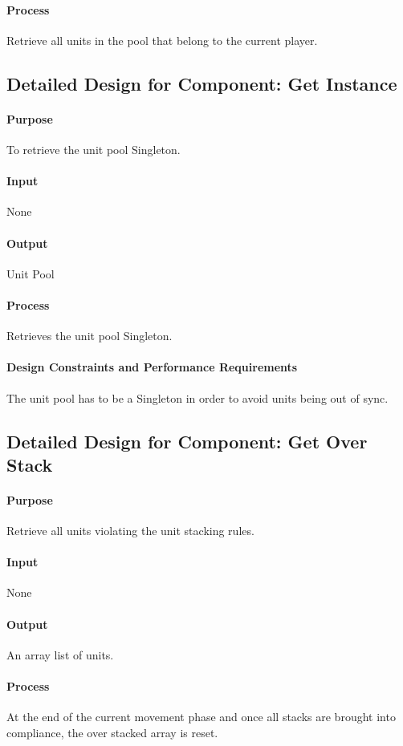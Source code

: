 \documentclass[12pt,a4paper,titlepage]{article}
\begin{document}
\paragraph{Process} Retrieve all units in the pool that belong to the current player.

\subsection{Detailed Design for Component: Get Instance}
\paragraph{Purpose} To retrieve the unit pool Singleton.
\paragraph{Input} None
\paragraph{Output} Unit Pool
\paragraph{Process} Retrieves the unit pool Singleton.
\paragraph{Design Constraints and Performance Requirements} The unit pool has to be a Singleton in order to avoid units being out of sync.

\subsection{Detailed Design for Component: Get Over Stack}
\paragraph{Purpose} Retrieve all units violating the unit stacking rules.
\paragraph{Input} None
\paragraph{Output} An array list of units.
\paragraph{Process} At the end of the current movement phase and once all stacks are brought into compliance, the over stacked array is reset.
\end{document}
